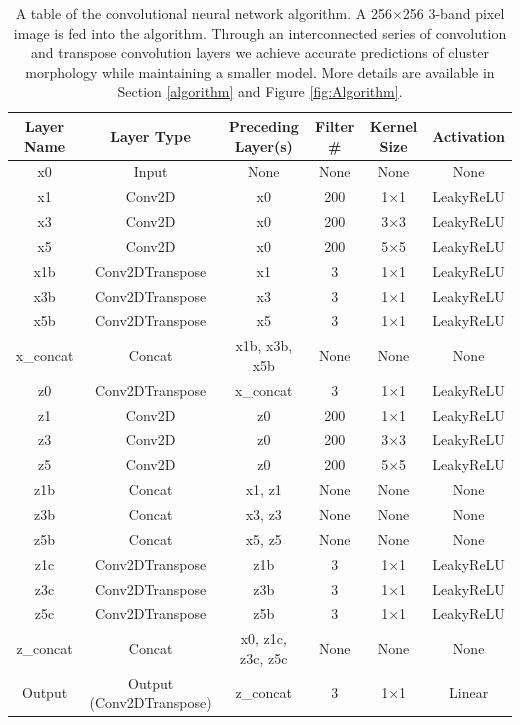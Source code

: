 \documentclass[twocolumn, 11pt]{aastex63}%
\begin{document}
\begin{table}%
\centering
 \begin{tabular}{||c c c c c c||} 
 \hline
 Layer Name & Layer Type & Preceding Layer(s) & Filter \# & Kernel Size & Activation \\ [0.5ex] 
 \hline\hline
 x0 & Input & None & None & None & None \\ 
 x1 & Conv2D & x0 & 200 & 1$\times$1 & LeakyReLU\\
 x3 & Conv2D & x0 & 200 & 3$\times$3 & LeakyReLU\\
 x5 & Conv2D & x0 & 200 & 5$\times$5 & LeakyReLU\\
 x1b & Conv2DTranspose & x1 & 3 & 1$\times$1 & LeakyReLU\\ 
 x3b & Conv2DTranspose & x3 & 3 & 1$\times$1 & LeakyReLU\\
 x5b & Conv2DTranspose & x5 & 3 & 1$\times$1 & LeakyReLU\\
 x\_concat & Concat & x1b, x3b, x5b & None & None & None\\
 z0 & Conv2DTranspose & x\_concat & 3 & 1$\times$1 & LeakyReLU\\
 z1 & Conv2D & z0 & 200 & 1$\times$1 & LeakyReLU\\
 z3 & Conv2D & z0 & 200 & 3$\times$3 & LeakyReLU\\
 z5 & Conv2D & z0 & 200 & 5$\times$5 & LeakyReLU\\
 z1b & Concat & x1, z1 & None & None & None\\ 
 z3b & Concat & x3, z3 & None & None & None\\
 z5b & Concat & x5, z5 & None & None & None\\
 z1c & Conv2DTranspose & z1b & 3 & 1$\times$1 & LeakyReLU\\ 
 z3c & Conv2DTranspose & z3b & 3 & 1$\times$1 & LeakyReLU\\
 z5c & Conv2DTranspose & z5b & 3 & 1$\times$1 & LeakyReLU\\
 z\_concat & Concat & x0, z1c, z3c, z5c & None & None & None\\ 
 Output & Output (Conv2DTranspose) & z\_concat & 3 & 1$\times$1 & Linear\\[1ex] 
 \hline
 \end{tabular}
 \caption{\label{tab:algorithm_breakdown}A table of the convolutional neural network algorithm. A 256$\times$256 3-band pixel image is fed into the algorithm. Through an interconnected series of convolution and transpose convolution layers we achieve accurate predictions of cluster morphology while maintaining a smaller model. More details are available in Section \ref{algorithm} and Figure \ref{fig:Algorithm}.}
\end{table}
\end{document}
